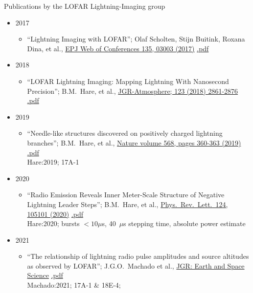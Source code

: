 \documentclass[fleqn,11pt]{article}
\begin{document}
{\Large Publications by the LOFAR Lightning-Imaging group}

\begin{itemize}
\item{2017}
\begin{itemize}
\item ``Lightning Imaging with LOFAR''; Olaf Scholten, Stijn Buitink, Roxana Dina, et al.,
 \href{https://doi.org/10.1051/epjconf/201713503003}{EPJ Web of Conferences 135, 03003 (2017)}
\href{https://www.epj-conferences.org/articles/epjconf/pdf/2017/04/epjconf_arena2017_03003.pdf}{.pdf}
\end{itemize}

\item{2018}
\begin{itemize}
\item ``LOFAR Lightning Imaging: Mapping Lightning With Nanosecond Precision''; B.M.\ Hare, et al.,
 \href{https://doi.org/10.1002/2017JD028132}{JGR-Atmosphere; 123 (2018) 2861-2876}
\href{https://drive.google.com/file/d/1vezngJcZ61hRrt8Tcy9CnP_zXdV4bjua/view?usp=sharing}{.pdf}
\end{itemize}

\item{2019}
\begin{itemize}
\item ``Needle-like structures discovered on positively charged lightning branches''; B.M.\ Hare, et al.,
 \href{https://doi.org/10.1038/s41586-019-1086-6}{Nature volume 568, pages 360-363 (2019)}
\href{https://drive.google.com/file/d/13ZQhrlQCmd03sfZ765F3xytzUnJzobnH/view?usp=sharing}{.pdf}
\\ Hare:2019; 17A-1
\end{itemize}

\item{2020}
\begin{itemize}
\item ``Radio Emission Reveals Inner Meter-Scale Structure of Negative Lightning Leader Steps''; B.M.\ Hare, et al.,
 \href{https://doi.org/10.1103/PhysRevLett.124.105101}{Phys.\ Rev.\ Lett.\ 124, 105101 (2020)}
\href{https://drive.google.com/file/d/1KHlmFhRyaO-jcH-ZWVmEFVZMldi75vc7/view?usp=sharing}{.pdf}
\\Hare:2020; bursts $<10\mu$s, 40~$\mu$s stepping time, absolute power estimate
\end{itemize}


\item{2021}
\begin{itemize}
\item ``The relationship of lightning radio pulse amplitudes and source altitudes as observed by LOFAR''; J.G.O.\ Machado et al.,
 \href{https://doi.org/10.1029/2021EA001958}{JGR: Earth and Space Science}
\href{https://drive.google.com/file/d/19CIRVmTa6FGWF4RwcSvupHWzvTjZF5Lv/view?usp=sharing}{.pdf}
\\Machado:2021; 17A-1 \& 18E-4;


\end{itemize}
\end{itemize}
\end{document}
